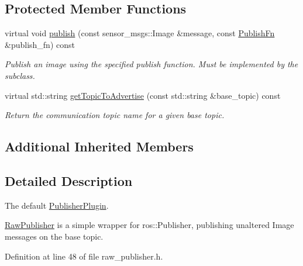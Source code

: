 \subsection*{Protected Member Functions}
\begin{DoxyCompactItemize}
\item 
virtual void \hyperlink{classimage__transport_1_1_raw_publisher_a5d82f75d47a79f1df0be82165398e8fa}{publish} (const sensor\-\_\-msgs\-::\-Image \&message, const \hyperlink{classimage__transport_1_1_simple_publisher_plugin_a01bd11cb3ee6b7ce6715a3b57feadf93}{Publish\-Fn} \&publish\-\_\-fn) const 
\begin{DoxyCompactList}\small\item\em Publish an image using the specified publish function. Must be implemented by the subclass. \end{DoxyCompactList}\item 
virtual std\-::string \hyperlink{classimage__transport_1_1_raw_publisher_a18a9e588fde64cffdf43a3cebba7b471}{get\-Topic\-To\-Advertise} (const std\-::string \&base\-\_\-topic) const 
\begin{DoxyCompactList}\small\item\em Return the communication topic name for a given base topic. \end{DoxyCompactList}\end{DoxyCompactItemize}
\subsection*{Additional Inherited Members}


\subsection{Detailed Description}
The default \hyperlink{classimage__transport_1_1_publisher_plugin}{Publisher\-Plugin}. 

\hyperlink{classimage__transport_1_1_raw_publisher}{Raw\-Publisher} is a simple wrapper for ros\-::\-Publisher, publishing unaltered Image messages on the base topic. 

Definition at line 48 of file raw\-\_\-publisher.\-h.



